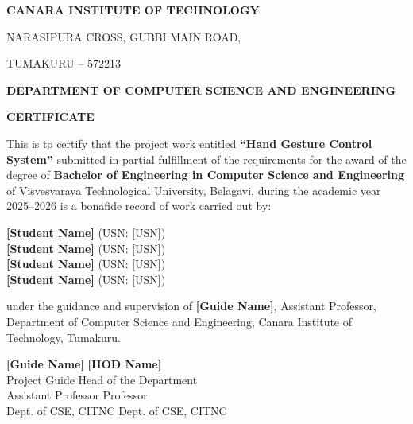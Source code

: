 \documentclass[12pt,a4paper]{report}
\begin{document}
\newpage
\thispagestyle{frontmatter}
\begin{center}
    {\LARGE \textbf{CANARA INSTITUTE OF TECHNOLOGY}\par}
    {\large NARASIPURA CROSS, GUBBI MAIN ROAD,\par}
    {\large TUMAKURU -- 572213\par}
    
    \vspace{1cm}
    
    {\Large \textbf{DEPARTMENT OF COMPUTER SCIENCE AND ENGINEERING}\par}
    
    \vspace{2cm}
    
    {\LARGE \textbf{CERTIFICATE}\par}
\end{center}

\vspace{1cm}

This is to certify that the project work entitled \textbf{``Hand Gesture Control System''} submitted in partial fulfillment of the requirements for the award of the degree of \textbf{Bachelor of Engineering in Computer Science and Engineering} of Visvesvaraya Technological University, Belagavi, during the academic year 2025--2026 is a bonafide record of work carried out by:

\vspace{0.5cm}

\begin{center}
\textbf{[Student Name]} (USN: [USN])\\
\textbf{[Student Name]} (USN: [USN])\\
\textbf{[Student Name]} (USN: [USN])\\
\textbf{[Student Name]} (USN: [USN])
\end{center}

\vspace{0.5cm}

under the guidance and supervision of \textbf{[Guide Name]}, Assistant Professor, Department of Computer Science and Engineering, Canara Institute of Technology, Tumakuru.

\vspace{2cm}

\begin{flushleft}
\textbf{[Guide Name]} \hfill \textbf{[HOD Name]}\\
Project Guide \hfill Head of the Department\\
Assistant Professor \hfill Professor\\
Dept. of CSE, CITNC \hfill Dept. of CSE, CITNC
\end{flushleft}
\end{document}
